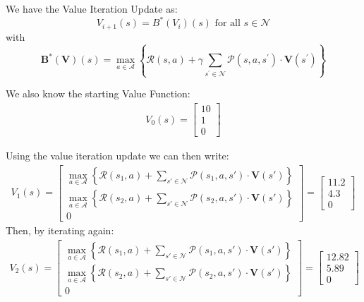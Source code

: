 \documentclass[11pt]{article}
\begin{document}
We have the Value Iteration Update as:
$$
V_{i+1}(s)=B^*\left(V_i\right)(s) \text { for all } s \in \mathcal{N}
$$
with
$$
\boldsymbol{B}^*(\boldsymbol{V})(s)=\max _{a \in \mathcal{A}}\left\{\mathcal{R}(s, a)+\gamma \sum_{s^{\prime} \in \mathcal{N}} \mathcal{P}\left(s, a, s^{\prime}\right) \cdot \boldsymbol{V}\left(s^{\prime}\right)\right\}
$$

We also know the starting Value Function:
\begin{align}
    V_0(s) = \begin{bmatrix}
        10 \\
        1\\
        0
    \end{bmatrix}
\end{align}

Using the value iteration update we can then write:
\begin{align}
    V_1(s) = \begin{bmatrix}
        \max_{a\in\mathcal{A}} \left\{\mathcal{R}(s_1, a) + \sum_{s' \in \mathcal{N}} \mathcal{P}(s_1, a, s') \cdot \boldsymbol{V}(s') \right\}\\
        \max_{a\in\mathcal{A}} \left\{\mathcal{R}(s_2, a) + \sum_{s' \in \mathcal{N}} \mathcal{P}(s_2, a, s') \cdot \boldsymbol{V}(s') \right\}\\
        0
    \end{bmatrix} = \begin{bmatrix}
        11.2\\
        4.3\\
        0
    \end{bmatrix}
\end{align}
Then, by iterating again:
\begin{align}
    V_2(s) = \begin{bmatrix}
        \max_{a\in\mathcal{A}} \left\{\mathcal{R}(s_1, a) + \sum_{s' \in \mathcal{N}} \mathcal{P}(s_1, a, s') \cdot \boldsymbol{V}(s') \right\}\\
        \max_{a\in\mathcal{A}} \left\{\mathcal{R}(s_2, a) + \sum_{s' \in \mathcal{N}} \mathcal{P}(s_2, a, s') \cdot \boldsymbol{V}(s') \right\}\\
        0
    \end{bmatrix} = \begin{bmatrix}
        12.82\\
        5.89\\
        0
    \end{bmatrix}
\end{align}
\end{document}
